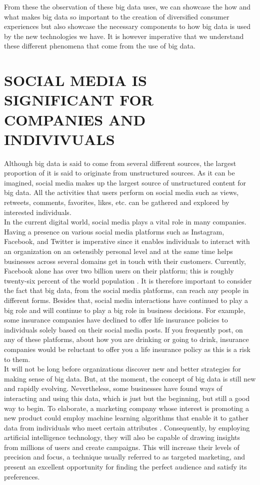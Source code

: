 \documentclass[sigconf]{acmart}
\begin{document}
From these the observation of these big data uses, we can showcase the how and what makes big data so important to the creation of diversified consumer experiences but also showcase the necessary components to how big data is used by the new technologies we have. It is however imperative that we understand these different phenomena that come from the use of big data.

\section{SOCIAL MEDIA IS SIGNIFICANT FOR COMPANIES AND INDIVIVUALS}

Although big data is said to come from several different sources, the largest proportion of it is said to originate from unstructured sources. As it can be imagined, social media makes up the largest source of unstructured content for big data. All the activities that users perform on social media such as views, retweets, comments, favorites, likes, etc. can be gathered and explored by interested individuals. \\

In the current digital world, social media plays a vital role in many companies. Having a presence on various social media platforms such as Instagram, Facebook, and Twitter is imperative since it enables individuals to interact with an organization on an ostensibly personal level and at the same time helps businesses across several domains get in touch with their customers. Currently, Facebook alone has over two billion users on their platform; this is roughly twenty-six percent of the world population \cite{6}. It is therefore important to consider the fact that big data, from the social media platforms, can reach any people in different forms. Besides that, social media interactions have continued to play a big role and will continue to play a big role in business decisions. For example, some insurance companies have declined to offer life insurance policies to individuals solely based on their social media posts. If you frequently post, on any of these platforms, about how you are drinking or going to drink, insurance companies would be reluctant to offer you a life insurance policy as this is a risk to them. \\

It will not be long before organizations discover new and better strategies for making sense of big data. But, at the moment, the concept of big data is still new and rapidly evolving. Nevertheless, some businesses have found ways of interacting and using this data, which is just but the beginning, but still a good way to begin. To elaborate, a marketing company whose interest is promoting a new product could employ machine learning algorithms that enable it to gather data from individuals who meet certain attributes \cite{6}. Consequently, by employing artificial intelligence technology, they will also be capable of drawing insights from millions of users and create campaigns. This will increase their levels of precision and focus, a technique usually referred to as targeted marketing, and present an excellent opportunity for finding the perfect audience and satisfy its preferences. 
\end{document}
